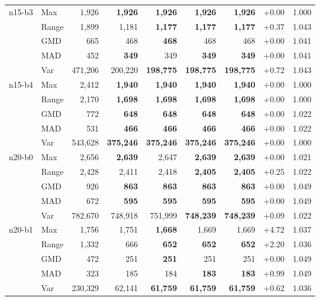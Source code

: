 \begin{small}
\begin{longtable}{llrrrrrrr}
n15-b3 & Max & 1,926 & \textbf{1,926} & \textbf{1,926} & \textbf{1,926} & \textbf{1,926} & +0.00 & 1.000 \\
 & Range & 1,899 & 1,181 & \textbf{1,177} & \textbf{1,177} & \textbf{1,177} & +0.37 & 1.043 \\
 & GMD & 665 & 468 & \textbf{468} & 468 & 468 & +0.00 & 1.041 \\
 & MAD & 452 & \textbf{349} & 349 & \textbf{349} & \textbf{349} & +0.00 & 1.041 \\
 & Var & 471,206 & 200,220 & \textbf{198,775} & \textbf{198,775} & \textbf{198,775} & +0.72 & 1.043 \\
n15-b4 & Max & 2,412 & \textbf{1,940} & \textbf{1,940} & \textbf{1,940} & \textbf{1,940} & +0.00 & 1.000 \\
 & Range & 2,170 & \textbf{1,698} & \textbf{1,698} & \textbf{1,698} & \textbf{1,698} & +0.00 & 1.000 \\
 & GMD & 772 & \textbf{648} & \textbf{648} & \textbf{648} & \textbf{648} & +0.00 & 1.022 \\
 & MAD & 531 & \textbf{466} & \textbf{466} & \textbf{466} & \textbf{466} & +0.00 & 1.022 \\
 & Var & 543,628 & \textbf{375,246} & \textbf{375,246} & \textbf{375,246} & \textbf{375,246} & +0.00 & 1.000 \\
n20-b0 & Max & 2,656 & \textbf{2,639} & 2,647 & \textbf{2,639} & \textbf{2,639} & +0.00 & 1.021 \\
 & Range & 2,428 & 2,411 & 2,418 & \textbf{2,405} & \textbf{2,405} & +0.25 & 1.022 \\
 & GMD & 926 & \textbf{863} & \textbf{863} & \textbf{863} & \textbf{863} & +0.00 & 1.049 \\
 & MAD & 672 & \textbf{595} & \textbf{595} & \textbf{595} & \textbf{595} & +0.00 & 1.049 \\
 & Var & 782,670 & 748,918 & 751,999 & \textbf{748,239} & \textbf{748,239} & +0.09 & 1.022 \\
n20-b1 & Max & 1,756 & 1,751 & \textbf{1,668} & 1,669 & 1,669 & +4.72 & 1.037 \\
 & Range & 1,332 & 666 & \textbf{652} & \textbf{652} & \textbf{652} & +2.20 & 1.036 \\
 & GMD & 472 & 251 & \textbf{251} & 251 & 251 & +0.00 & 1.049 \\
 & MAD & 323 & 185 & 184 & \textbf{183} & \textbf{183} & +0.99 & 1.049 \\
 & Var & 230,329 & 62,141 & \textbf{61,759} & \textbf{61,759} & \textbf{61,759} & +0.62 & 1.036 \\

\end{longtable}
\end{small}
